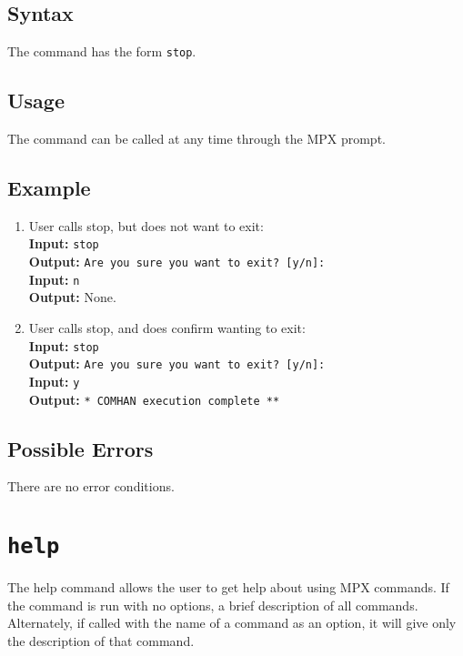 \subsection{Syntax}

The command has the form {\tt stop}.

\subsection{Usage}

The command can be called at any time through the MPX prompt.

\subsection{Example}
\begin{enumerate}
    \item User calls stop, but does not want to exit: \\
        {\bf Input:} {\tt stop} \\
        {\bf Output:} {\tt Are you sure you want to exit? [y/n]:} \\
        {\bf Input:} {\tt n} \\
        {\bf Output:} None.
    \item User calls stop, and does confirm wanting to exit: \\
        {\bf Input:} {\tt stop} \\
        {\bf Output:} {\tt Are you sure you want to exit? [y/n]:} \\
        {\bf Input:} {\tt y} \\
        {\bf Output:} {\tt ** COMHAN execution complete **}

\end{enumerate}
\subsection{Possible Errors}

There are no error conditions.








\section{\tt help}
\label{help_cmd}

The help command allows the user to get help about using MPX commands. If the command is
run with no options, a brief description of all commands. Alternately, if called with the
name of a command as an option, it will give only the description of that command.

